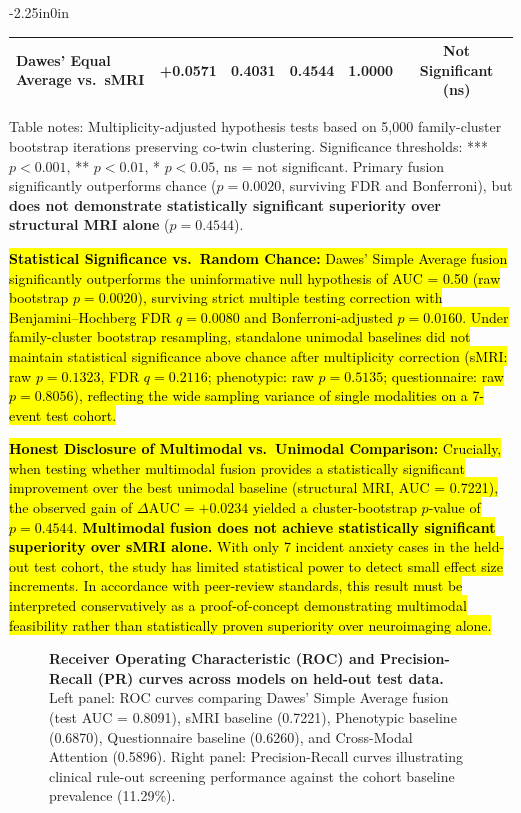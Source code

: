 \documentclass[10pt,letterpaper]{article}
\begin{document}
\begin{table}[!t]
\begin{adjustwidth}{-2.25in}{0in}
\begin{tabular}{|l|c|c|c|c|c|}
\hline
Dawes' Equal Average vs.\ sMRI & +0.0571 & 0.4031 & 0.4544 & 1.0000 & Not Significant (ns) \\
\hline
\end{tabular}
\begin{flushleft}
Table notes: Multiplicity-adjusted hypothesis tests based on 5,000 family-cluster bootstrap iterations preserving co-twin clustering. Significance thresholds: *** $p < 0.001$, ** $p < 0.01$, * $p < 0.05$, ns = not significant. Primary fusion significantly outperforms chance ($p = 0.0020$, surviving FDR and Bonferroni), but \textbf{does not demonstrate statistically significant superiority over structural MRI alone} ($p = 0.4544$).
\end{flushleft}
\end{adjustwidth}
\end{table}

\hl{\textbf{Statistical Significance vs.\ Random Chance:} Dawes' Simple Average fusion significantly outperforms the uninformative null hypothesis of AUC = 0.50 (raw bootstrap $p = 0.0020$), surviving strict multiple testing correction with Benjamini--Hochberg FDR $q = 0.0080$ and Bonferroni-adjusted $p = 0.0160$. Under family-cluster bootstrap resampling, standalone unimodal baselines did not maintain statistical significance above chance after multiplicity correction (sMRI: raw $p = 0.1323$, FDR $q = 0.2116$; phenotypic: raw $p = 0.5135$; questionnaire: raw $p = 0.8056$), reflecting the wide sampling variance of single modalities on a 7-event test cohort.}

\hl{\textbf{Honest Disclosure of Multimodal vs.\ Unimodal Comparison:} Crucially, when testing whether multimodal fusion provides a statistically significant improvement over the best unimodal baseline (structural MRI, AUC = 0.7221), the observed gain of $\Delta\text{AUC} = +0.0234$ yielded a cluster-bootstrap $p$-value of $p = 0.4544$. \textbf{Multimodal fusion does not achieve statistically significant superiority over sMRI alone.} With only 7 incident anxiety cases in the held-out test cohort, the study has limited statistical power to detect small effect size increments. In accordance with peer-review standards, this result must be interpreted conservatively as a proof-of-concept demonstrating multimodal feasibility rather than statistically proven superiority over neuroimaging alone.}
        \begin{figure}[!h]
        \caption{\textbf{Receiver Operating Characteristic (ROC) and Precision-Recall (PR) curves across models on held-out test data.}
        Left panel: ROC curves comparing Dawes' Simple Average fusion (test AUC = 0.8091), sMRI baseline (0.7221), Phenotypic baseline (0.6870), Questionnaire baseline (0.6260), and Cross-Modal Attention (0.5896). Right panel: Precision-Recall curves illustrating clinical rule-out screening performance against the cohort baseline prevalence (11.29\%).}
        \label{fig:roc_pr_curves}
        \end{figure}
\end{document}
